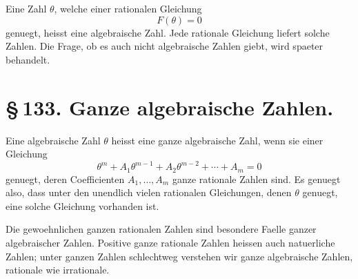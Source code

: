 \documentclass[11pt]{article}
\begin{document}
Eine Zahl \(\theta\), welche einer rationalen Gleichung
\begin{equation}
F(\theta)=0
\end{equation}
genuegt, heisst eine algebraische Zahl. Jede rationale Gleichung
liefert solche Zahlen. Die Frage, ob es auch nicht algebraische
Zahlen giebt, wird spaeter behandelt.

\section*{\S\,133. Ganze algebraische Zahlen.}

Eine algebraische Zahl \(\theta\) heisst eine ganze algebraische Zahl,
wenn sie einer Gleichung
\begin{equation}
\theta^m+A_1\theta^{m-1}+A_2\theta^{m-2}+\cdots +A_m=0
\tag{1}
\end{equation}
genuegt, deren Coefficienten \(A_1,\ldots,A_m\) ganze rationale Zahlen
sind. Es genuegt also, dass unter den unendlich vielen rationalen
Gleichungen, denen \(\theta\) genuegt, eine solche Gleichung vorhanden
ist.

Die gewoehnlichen ganzen rationalen Zahlen sind besondere Faelle
ganzer algebraischer Zahlen. Positive ganze rationale Zahlen heissen
auch natuerliche Zahlen; unter ganzen Zahlen schlechtweg verstehen wir
ganze algebraische Zahlen, rationale wie irrationale.
\end{document}
